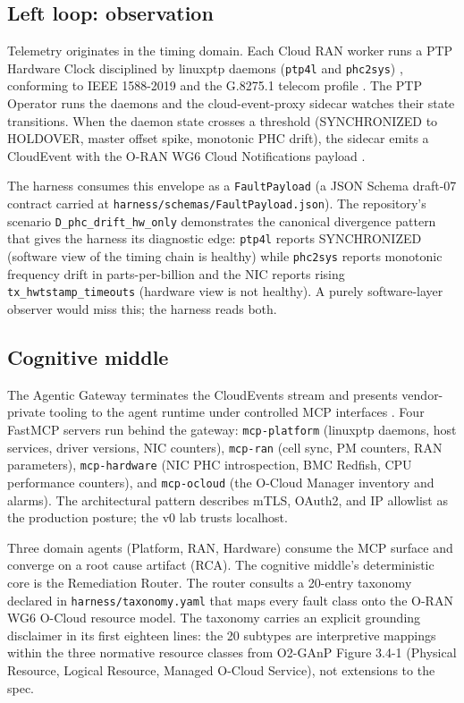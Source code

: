 \documentclass[twocolumn,10pt,a4paper]{article}
\begin{document}
\subsection{Left loop: observation}

Telemetry originates in the timing domain. Each Cloud RAN worker runs a PTP Hardware Clock disciplined by linuxptp daemons (\texttt{ptp4l} and \texttt{phc2sys}) \cite{linuxptp_ptp4l}, conforming to IEEE 1588-2019 \cite{ieee_1588_2019} and the G.8275.1 telecom profile \cite{itu_g82751}. The PTP Operator \cite{redhat_ptp_operator} runs the daemons and the cloud-event-proxy sidecar \cite{cloud_event_proxy} watches their state transitions. When the daemon state crosses a threshold (SYNCHRONIZED to HOLDOVER, master offset spike, monotonic PHC drift), the sidecar emits a CloudEvent \cite{cncf_cloudevents} with the O-RAN WG6 Cloud Notifications payload \cite{oran_cloud_notifications}.

The harness consumes this envelope as a \texttt{FaultPayload} (a JSON Schema draft-07 contract carried at \texttt{harness/schemas/FaultPayload.json}). The repository's scenario \texttt{D\_phc\_drift\_hw\_only} demonstrates the canonical divergence pattern that gives the harness its diagnostic edge: \texttt{ptp4l} reports SYNCHRONIZED (software view of the timing chain is healthy) while \texttt{phc2sys} reports monotonic frequency drift in parts-per-billion and the NIC reports rising \texttt{tx\_hwtstamp\_timeouts} (hardware view is not healthy). A purely software-layer observer would miss this; the harness reads both.

\subsection{Cognitive middle}

The Agentic Gateway terminates the CloudEvents stream and presents vendor-private tooling to the agent runtime under controlled MCP interfaces \cite{mcp_spec,mcp_python_sdk,fastmcp}. Four FastMCP servers run behind the gateway: \texttt{mcp-platform} (linuxptp daemons, host services, driver versions, NIC counters), \texttt{mcp-ran} (cell sync, PM counters, RAN parameters), \texttt{mcp-hardware} (NIC PHC introspection, BMC Redfish, CPU performance counters), and \texttt{mcp-ocloud} (the O-Cloud Manager inventory and alarms). The architectural pattern describes mTLS, OAuth2, and IP allowlist as the production posture; the v0 lab trusts localhost.

Three domain agents (Platform, RAN, Hardware) consume the MCP surface and converge on a root cause artifact (RCA). The cognitive middle's deterministic core is the Remediation Router. The router consults a 20-entry taxonomy declared in \texttt{harness/taxonomy.yaml} that maps every fault class onto the O-RAN WG6 O-Cloud resource model. The taxonomy carries an explicit grounding disclaimer in its first eighteen lines: the 20 subtypes are interpretive mappings within the three normative resource classes from O2-GAnP Figure 3.4-1 (Physical Resource, Logical Resource, Managed O-Cloud Service), not extensions to the spec.
\end{document}
